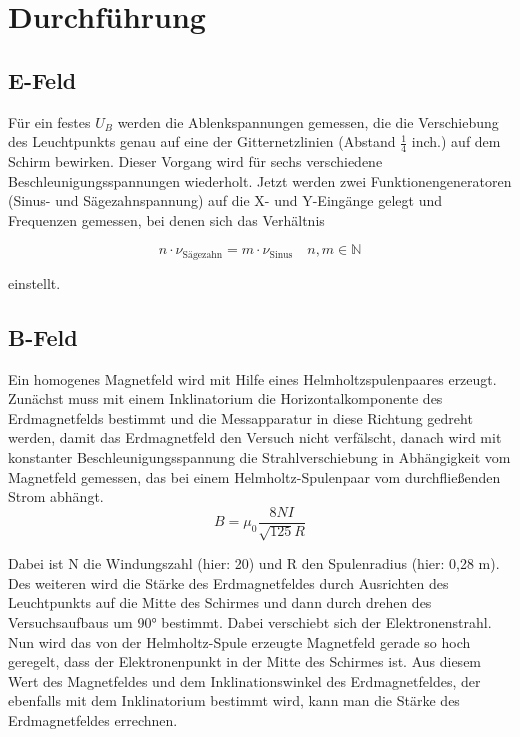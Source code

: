 \section{Durchführung}
\subsection{E-Feld}

Für ein festes $U_B$ werden die Ablenkspannungen gemessen, die die Verschiebung des Leuchtpunkts genau auf eine der Gitternetzlinien (Abstand $\frac{1}{4}$ inch.) auf dem Schirm bewirken. Dieser Vorgang wird für
sechs verschiedene Beschleunigungsspannungen wiederholt.
Jetzt werden zwei Funktionengeneratoren (Sinus- und Sägezahnspannung) auf die X- und Y-Eingänge gelegt und Frequenzen gemessen, bei denen sich das Verhältnis 

\begin{equation}
n \cdot \nu_\text{Sägezahn} = m \cdot \nu_\text{Sinus} \quad n, m\in\mathbb{N}
\end{equation}

einstellt.

\subsection{B-Feld}

Ein homogenes Magnetfeld wird mit Hilfe eines Helmholtzspulenpaares erzeugt. Zunächst muss
mit einem Inklinatorium die Horizontalkomponente des Erdmagnetfelds bestimmt und die
Messapparatur in diese Richtung gedreht werden, damit das Erdmagnetfeld den Versuch nicht verfälscht,
danach wird mit konstanter Beschleunigungsspannung die Strahlverschiebung in Abhängigkeit vom Magnetfeld gemessen, das bei einem Helmholtz-Spulenpaar vom durchfließenden Strom abhängt.
\begin{equation}
B = \mu_0\frac{8 N I}{\sqrt{125}R}
\end{equation}

Dabei ist N die Windungszahl (hier: 20) und R den Spulenradius (hier: 0,28 m).
Des weiteren wird die Stärke des Erdmagnetfeldes durch Ausrichten des Leuchtpunkts auf die Mitte des Schirmes und dann durch drehen des Versuchsaufbaus um 90° bestimmt. Dabei verschiebt sich der Elektronenstrahl. Nun wird das von der Helmholtz-Spule erzeugte Magnetfeld
gerade so hoch geregelt, dass der Elektronenpunkt in der Mitte des Schirmes ist. Aus diesem Wert des Magnetfeldes und dem Inklinationswinkel des Erdmagnetfeldes, der ebenfalls mit dem Inklinatorium bestimmt wird, kann man die Stärke des Erdmagnetfeldes errechnen.
